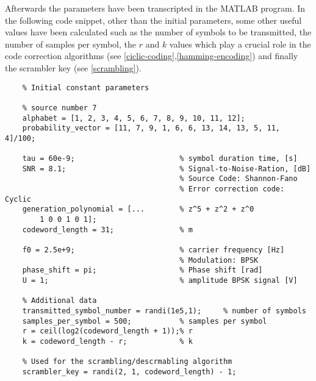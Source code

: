 \FloatBarrier\noindent Afterwards the parameters have been transcripted in the MATLAB program. In the following code snippet, other than the initial parameters, some other useful values have been calculated such as the number of symbols to be transmitted, the number of samples per symbol, the $r$ and $k$ values which play a crucial role in the code correction algorithms (see \ref{ciclic-coding},\ref{hamming-encoding}) and finally the scrambler key (see \ref{scrambling}).

\begin{lstlisting}
    % Initial constant parameters

    % source number 7
    alphabet = [1, 2, 3, 4, 5, 6, 7, 8, 9, 10, 11, 12];
    probability_vector = [11, 7, 9, 1, 6, 6, 13, 14, 13, 5, 11, 4]/100;
    
    tau = 60e-9;                        % symbol duration time, [s]
    SNR = 8.1;                          % Signal-to-Noise-Ration, [dB]
                                        % Source Code: Shannon-Fano
                                        % Error correction code: Cyclic
    generation_polynomial = [...        % z^5 + z^2 + z^0
        1 0 0 1 0 1]; 
    codeword_length = 31;               % m
    
    f0 = 2.5e+9;                        % carrier frequency [Hz]
                                        % Modulation: BPSK
    phase_shift = pi;                   % Phase shift [rad]
    U = 1;                              % amplitude BPSK signal [V]
    
    % Additional data
    transmitted_symbol_number = randi(1e5,1);     % number of symbols   
    samples_per_symbol = 500;           % samples per symbol
    r = ceil(log2(codeword_length + 1));% r
    k = codeword_length - r;            % k
    
    % Used for the scrambling/descrmabling algorithm
    scrambler_key = randi(2, 1, codeword_length) - 1; 
\end{lstlisting}





\setcounter{secnumdepth}{1}

